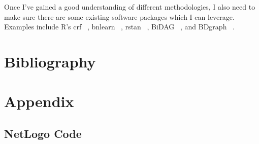\documentclass[a4paper, 11pt]{report}
\begin{document}
	Once I've gained a good understanding of different methodologies, I also need to make sure there are some existing software packages which I can leverage. Examples include R's crf ~\cite{ling2019}, bnlearn ~\cite{scutari2021}, rstan ~\cite{guo2021}, BiDAG ~\cite{suter2021}, and BDgraph ~\cite{mohammadi2021}.

\chapter*{Bibliography}
\printbibliography

\chapter*{Appendix}
\section*{NetLogo Code}
\label{append:netlogo}

	
\end{document}
